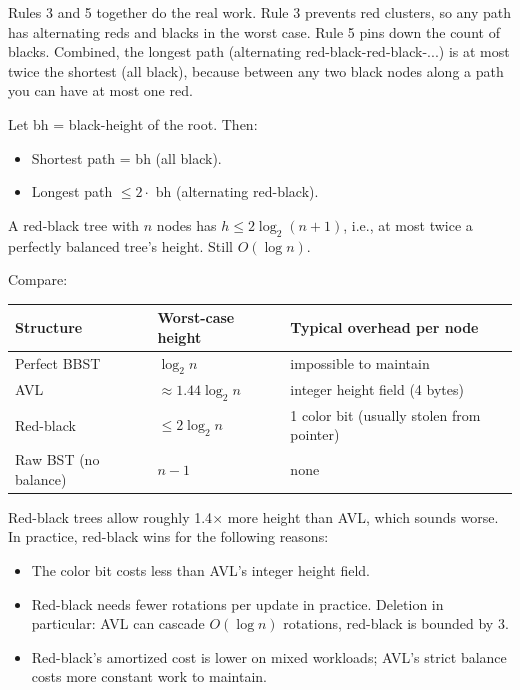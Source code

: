 \documentclass[11pt]{article}
\begin{document}
Rules 3 and 5 together do the real work. Rule 3 prevents red clusters, so any path has alternating reds and blacks in the worst case. Rule 5 pins down the count of blacks. Combined, the longest path (alternating red-black-red-black-...) is at most twice the shortest (all black), because between any two black nodes along a path you can have at most one red.

\begin{defnbox}
Let bh = black-height of the root. Then:
\begin{itemize}[leftmargin=*]
    \item Shortest path = bh (all black).
    \item Longest path $\le 2 \cdot$ bh (alternating red-black).
\end{itemize}
A red-black tree with $n$ nodes has $h \le 2 \log_2(n + 1)$, i.e., at most twice a perfectly balanced tree's height. Still $O(\log n)$.
\end{defnbox}

Compare:
\begin{center}
\begin{tabular}{lll}
Structure & Worst-case height & Typical overhead per node \\
\hline
Perfect BBST        & $\log_2 n$          & impossible to maintain \\
AVL                 & $\approx 1.44 \log_2 n$ & integer height field (4 bytes) \\
Red-black           & $\le 2 \log_2 n$    & 1 color bit (usually stolen from pointer) \\
Raw BST (no balance) & $n - 1$            & none \\
\end{tabular}
\end{center}

Red-black trees allow roughly 1.4$\times$ more height than AVL, which sounds worse. In practice, red-black wins for the following reasons:
\begin{itemize}[leftmargin=*]
    \item The color bit costs less than AVL's integer height field.
    \item Red-black needs fewer rotations per update in practice. Deletion in particular: AVL can cascade $O(\log n)$ rotations, red-black is bounded by 3.
    \item Red-black's amortized cost is lower on mixed workloads; AVL's strict balance costs more constant work to maintain.
\end{itemize}
\end{document}
